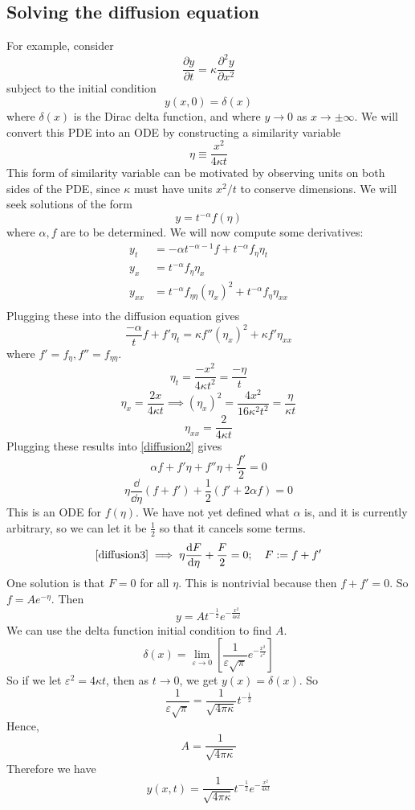 \subsection{Solving the diffusion equation}
For example, consider
\[
	\frac{\partial y}{\partial t} = \kappa \frac{\partial^2 y}{\partial x^2}
\]
subject to the initial condition
\[
	y(x, 0) = \delta(x)
\]
where \(\delta(x)\) is the Dirac delta function, and where \(y \to 0\) as \(x \to \pm \infty\).
We will convert this PDE into an ODE by constructing a similarity variable
\[
	\eta \equiv \frac{x^2}{4\kappa t}
\]
This form of similarity variable can be motivated by observing units on both sides of the PDE, since \(\kappa\) must have units \(x^2/t\) to conserve dimensions.
We will seek solutions of the form
\[
	y=t^{-\alpha}f(\eta)
\]
where \(\alpha, f\) are to be determined.
We will now compute some derivatives:
\begin{align*}
	y_t    & = -\alpha t^{-\alpha-1}f + t^{-\alpha} f_\eta \eta_t               \\
	y_x    & = t^{-\alpha}f_\eta \eta_x                                         \\
	y_{xx} & = t^{-\alpha}f_{\eta\eta} (\eta_x)^2 + t^{-\alpha}f_\eta \eta_{xx} \\
\end{align*}
Plugging these into the diffusion equation gives
\begin{equation}\label{diffusion2}
	\frac{-\alpha}{t}f + f'\eta_t = \kappa f''(\eta_{x})^2 + \kappa f' \eta_{xx}
\end{equation}
where \(f'=f_\eta, f''=f_{\eta\eta}\).
\[
	\eta_t = \frac{-x^2}{4\kappa t^2} = \frac{-\eta}{t}
\]
\[
	\eta_x = \frac{2x}{4\kappa t} \implies (\eta_x)^2 = \frac{4x^2}{16\kappa^2t^2} = \frac{\eta}{\kappa t}
\]
\[
	\eta_{xx} = \frac{2}{4\kappa t}
\]
Plugging these results into \eqref{diffusion2} gives
\[
	\alpha f + f' \eta + f'' \eta + \frac{f'}{2} = 0
\]
\begin{equation}\label{diffusion3}
	\eta \frac{\dd}{\dd \eta}(f + f') + \frac{1}{2}(f' + 2\alpha f) = 0
\end{equation}
This is an ODE for \(f(\eta)\).
We have not yet defined what \(\alpha\) is, and it is currently arbitrary, so we can let it be \(\frac{1}{2}\) so that it cancels some terms.
\[
	\eqref{diffusion3} \implies \eta \frac{\dd{F}}{\dd \eta} + \frac{F}{2} = 0;\quad F := f+f'
\]
One solution is that \(F = 0\) for all \(\eta\).
This is nontrivial because then \(f + f' = 0\).
So \(f = Ae^{-\eta}\).
Then
\[
	y = At^{-\frac{1}{2}}e^{-\frac{x^2}{4\kappa t}}
\]
We can use the delta function initial condition to find \(A\).
\[
	\delta(x) = \lim_{\varepsilon \to 0} \left[ \frac{1}{\varepsilon\sqrt \pi} e^{-\frac{x^2}{\varepsilon^2}} \right]
\]
So if we let \(\varepsilon^2 = 4\kappa t\), then as \(t \to 0\), we get \(y(x) = \delta(x)\).
So
\[
	\frac{1}{\varepsilon\sqrt \pi} = \frac{1}{\sqrt{4 \pi \kappa}} t^{-\frac{1}{2}}
\]
Hence,
\[
	A = \frac{1}{\sqrt{4 \pi \kappa}}
\]
Therefore we have
\[
	y(x, t) = \frac{1}{\sqrt{4 \pi \kappa}} t^{-\frac{1}{2}} e^{-\frac{x^2}{4\kappa t}}
\]

